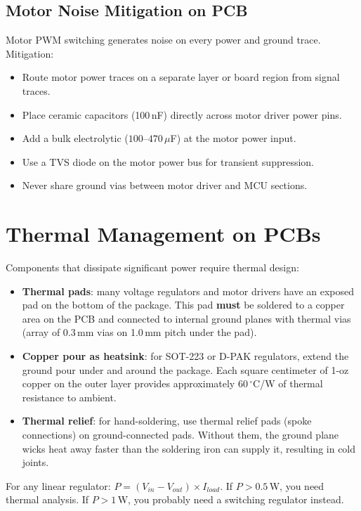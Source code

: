 \documentclass[11pt,letterpaper,twoside,openany]{book}
\begin{document}
\subsection{Motor Noise Mitigation on PCB}
Motor PWM switching generates noise on every power and ground trace. Mitigation:
\begin{itemize}[nosep,leftmargin=1.5em]
\item Route motor power traces on a separate layer or board region from signal traces.
\item Place ceramic capacitors (100\,nF) directly across motor driver power pins.
\item Add a bulk electrolytic ($100$--$470\,\mu$F) at the motor power input.
\item Use a TVS diode on the motor power bus for transient suppression.
\item Never share ground vias between motor driver and MCU sections.
\end{itemize}

\section{Thermal Management on PCBs}
Components that dissipate significant power require thermal design:
\begin{itemize}[leftmargin=1.5em]
\item \textbf{Thermal pads}: many voltage regulators and motor drivers have an exposed pad on the bottom of the package. This pad \textbf{must} be soldered to a copper area on the PCB and connected to internal ground planes with thermal vias (array of 0.3\,mm vias on 1.0\,mm pitch under the pad).
\item \textbf{Copper pour as heatsink}: for SOT-223 or D-PAK regulators, extend the ground pour under and around the package. Each square centimeter of 1-oz copper on the outer layer provides approximately $60\,^{\circ}$C/W of thermal resistance to ambient.
\item \textbf{Thermal relief}: for hand-soldering, use thermal relief pads (spoke connections) on ground-connected pads. Without them, the ground plane wicks heat away faster than the soldering iron can supply it, resulting in cold joints.
\end{itemize}

\begin{tipbox}
For any linear regulator: $P = (V_{in} - V_{out}) \times I_{load}$. If $P > 0.5$\,W, you need thermal analysis. If $P > 1$\,W, you probably need a switching regulator instead.
\end{tipbox}
\end{document}
